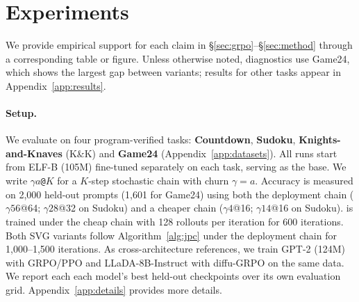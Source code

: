 \section{Experiments}
\label{sec:experiments}
\suppressfloats[t]
We provide empirical support for each claim in \S\ref{sec:grpo}--\S\ref{sec:method} through a corresponding table or figure. Unless otherwise noted, diagnostics use Game24, which shows the largest gap between variants; results for other tasks appear in Appendix~\ref{app:results}.

\paragraph{Setup.}
We evaluate on four program-verified tasks: \textbf{Countdown}, \textbf{Sudoku}, \textbf{Knights-and-Knaves} (K\&K) and \textbf{Game24} (Appendix~\ref{app:datasets}). All runs start from ELF-B (105M) fine-tuned separately on each task, serving as the base. We write $\gamma a$\texttt{@}$K$ for a $K$-step stochastic chain with churn $\gamma=a$. Accuracy is measured on 2{,}000 held-out prompts (1{,}601 for Game24) using both the deployment chain ($\gamma56$@64; $\gamma28$@32 on Sudoku) and a cheaper chain ($\gamma4$@16; $\gamma14$@16 on Sudoku). \methodGRPO{} is trained under the cheap chain with 128 rollouts per iteration for 600 iterations. Both SVG variants follow Algorithm~\ref{alg:jpc} under the deployment chain for 1{,}000--1{,}500 iterations. As cross-architecture references, we train GPT-2 (124M) with GRPO/PPO and LLaDA-8B-Instruct with diffu-GRPO \citep{zhao2025d1} on the same data. We report each each model's best held-out checkpoints over its own evaluation grid. Appendix~\ref{app:details} provides more details.

